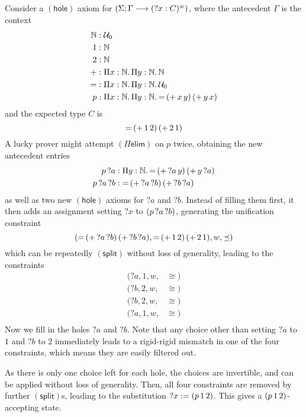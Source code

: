 \documentclass[twoside]{report}
\begin{document}
\begin{example}
Consider a $(\mathsf{hole})$ axiom for $(\Sigma; \Gamma \longrightarrow ({?x} : C)^w)$, where the antecedent $\Gamma$ is the context
$$
\begin{aligned}
\mathbb N &: \mathcal U_0 \\
1 &: \mathbb N \\
2 &: \mathbb N \\
+ &: \Pi{x} : {\mathbb N}.\,{\Pi{y} : {\mathbb N}.\,{\mathbb N}} \\
= &: \Pi{x} : {\mathbb N}.\,{\Pi{y} : {\mathbb N}.\,{\mathcal U_0}} \\
p &: \Pi{x} : {\mathbb N}.\,{\Pi{y} : {\mathbb N}.\,{{{=}\,{({{+}\,{x}}\,{y})}}\,{({{+}\,{y}}\,{x})}}}
\end{aligned}
$$
and the expected type $C$ is
$$
{{=}\,{({{+}\,{1}}\,{2})}}\,{({{+}\,{2}}\,{1})}
$$
A lucky prover might attempt $(\Pi\mathsf{elim})$ on $p$ twice, obtaining the new antecedent entries
$$
\begin{aligned}
{p}\,{?a} &: \Pi{y} : {\mathbb N}.\,{{{=}\,{({{+}\,{?a}}\,{y})}}\,{({{+}\,{y}}\,{?a})}} \\
{{p}\,{?a}}\,{?b} &: {{=}\,{({{+}\,{?a}}\,{?b})}}\,{({{+}\,{?b}}\,{?a})} \\
\end{aligned}
$$
as well as two new $(\mathsf{hole})$ axioms for ${?a}$ and ${?b}$. Instead of filling them first, it then adds an assignment setting ${?x}$ to $({{p}\,{?a}}\,{?b})$, generating the unification constraint
$$
({{=}\,{({{+}\,{?a}}\,{?b})}}\,{({{+}\,{?b}}\,{?a})}, {{=}\,{({{+}\,{1}}\,{2})}}\,{({{+}\,{2}}\,{1})}, w, \preceq)
$$
which can be repeatedly $(\mathsf{split})$ without loss of generality, leading to the constraints
$$
\begin{aligned}
({?a}, 1, w, &\cong) \\
({?b}, 2, w, &\cong) \\
({?b}, 2, w, &\cong) \\
({?a}, 1, w, &\cong) \\
\end{aligned}
$$
Now we fill in the holes ${?a}$ and ${?b}$. Note that any choice other than setting ${?a}$ to $1$ and ${?b}$ to $2$ immediately leads to a rigid-rigid mismatch in one of the four constraints, which means they are easily filtered out.

As there is only one choice left for each hole, the choices are invertible, and can be applied without loss of generality. Then, all four constraints are removed by further $(\mathsf{split})$s, leading to the substitution ${?x} := ({{p}\,{1}}\,{2})$. This gives a $({{p}\,{1}}\,{2})$-accepting state.
\end{example}
\end{document}
